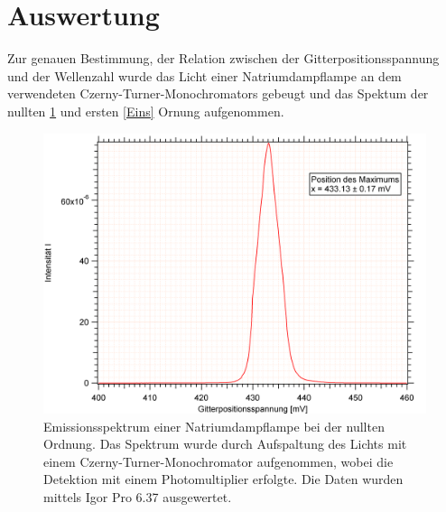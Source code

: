 


\section {Auswertung}

Zur genauen Bestimmung, der Relation zwischen der Gitterpositionsspannung und der Wellenzahl wurde das Licht einer Natriumdampflampe an dem verwendeten Czerny-Turner-Monochromators gebeugt und das Spektum der nullten \ref{Null} und ersten \ref{Eins} Ornung aufgenommen. 


\begin{figure}[H]
	\centering	
	\begin{minipage}{1\textwidth}
	\includegraphics[width=\columnwidth]{Bilder/Graph1.png}
	\end{minipage}
	
	
	\caption{Emissionsspektrum einer Natriumdampflampe bei der nullten Ordnung. Das Spektrum wurde durch Aufspaltung des Lichts mit einem Czerny-Turner-Monochromator aufgenommen, wobei die Detektion mit einem Photomultiplier erfolgte. Die Daten wurden mittels Igor Pro 6.37 ausgewertet.}
	

	\label{Null}
\end{figure}
